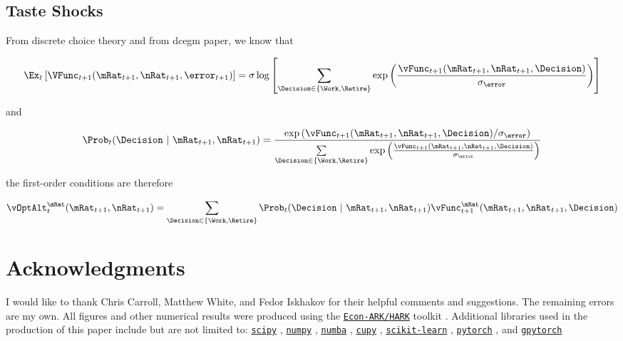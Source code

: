 \documentclass{article}
\begin{document}
\subsection{Taste Shocks}

From discrete choice theory and from \acrshort{dcegm} paper, we know that

\begin{equation}
\Ex_{t} \left[
        \VFunc_{t+1}(\mRat_{t+1}, \nRat_{t+1}, \error_{t+1}) \right] =
    \sigma \log \left[ \sum_{\Decision \in \{\Work, \Retire\}} \exp \left(
        \frac{\vFunc_{t+1}(\mRat_{t+1}, \nRat_{t+1},
            \Decision)}{\sigma_\error} \right)  \right]
\end{equation}

and

\begin{equation}
\Prob_{t}(\Decision ~ \lvert ~ \mRat_{t+1}, \nRat_{t+1}) = \frac{\exp
        \left(
        \vFunc_{t + 1}(\mRat_{t+1}, \nRat_{t+1}, \Decision) /
        \sigma_\error
        \right)
    }{ \sum\limits_{\Decision \in \{\Work, \Retire\}} \exp \left(
        \frac{\vFunc_{t+1}(\mRat_{t+1}, \nRat_{t+1},
            \Decision)}{\sigma_\error} \right)}
\end{equation}

the first-order conditions are therefore

\begin{equation}
\vOptAlt_{t}^{\mRat}(\mRat_{t+1}, \nRat_{t+1}) = \sum_{\Decision \in
        \{\Work, \Retire\}} \Prob_{t}(\Decision ~
    \lvert ~
    \mRat_{t+1}, \nRat_{t+1}) \vFunc_{t+1}^{\mRat}(\mRat_{t+1},
    \nRat_{t+1},
    \Decision)
\end{equation}
\printglossaries


\section*{Acknowledgments}
I would like to thank Chris Carroll, Matthew White, and Fedor Iskhakov for their helpful comments and suggestions. The remaining errors are my own. All figures and other numerical results were produced using the \href{https://econ-ark.org/}{\texttt{Econ-ARK/HARK}} toolkit \citep{Carroll2018}. Additional libraries used in the production of this paper include but are not limited to: \href{https://www.scipy.org/}{\texttt{scipy}} \citep{Virtanen2020}, \href{https://www.numpy.org/}{\texttt{numpy}} \citep{Harris2020}, \href{https://numba.pydata.org/}{\texttt{numba}} \citep{Lam2015}, \href{https://cupy.dev/}{\texttt{cupy}} \citep{Okuta2017}, \href{https://scikit-learn.org/}{\texttt{scikit-learn}} \citep{Pedregosa2011}, \href{https://pytorch.org/}{\texttt{pytorch}} \citep{Paszke2019}, and \href{https://gpytorch.ai/}{\texttt{gpytorch}} \citep{Gardner2018}




\end{document}
